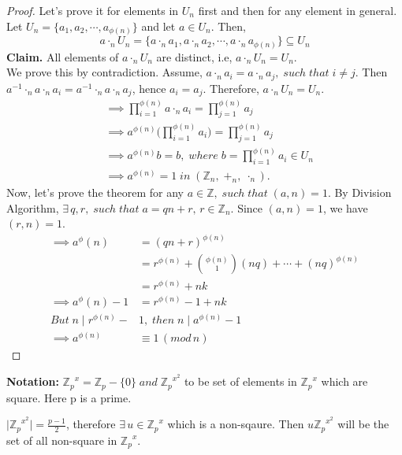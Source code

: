 \documentclass[10pt,a4paper]{article}
\begin{document}
\begin{proof}
Let's prove it for elements in $U_n$ first and then for any element in general. Let $U_n = \{a_1,a_2,\cdots,a_{\phi(n)}\}$ and let $a\in U_n.$ Then,
$$a\cdot_n U_n=\{a\cdot_n a_1,a\cdot_n a_2,\cdots,a\cdot_n a_{\phi(n)}\}\subseteq U_n$$
\textbf{Claim.} All elements of $a\cdot_n U_n$ are distinct, i.e, $a\cdot_n U_n = U_n$. \\
We prove this by contradiction. Assume, $a\cdot_n a_i = a\cdot_n a_j,\;such\;that\;i\neq j$. Then $a^{-1}\cdot_n a\cdot_n a_i = a^{-1}\cdot_n a\cdot_n a_j$, hence $a_i=a_j$. Therefore, $a\cdot_n U_n = U_n$. 
\begin{align*}
&\implies \prod_{i=1}^{\phi(n)}a\cdot_n a_i = \prod_{j=1}^{\phi(n)}a_j \\
&\implies a^{\phi(n)}\Bigg(\prod_{i=1}^{\phi(n)}a_i\Bigg) = \prod_{j=1}^{\phi(n)}a_j \\
&\implies a^{\phi(n)}b = b,\;where\;b=\prod_{i=1}^{\phi(n)}a_i \in U_n \\
&\implies a^{\phi(n)} = 1\;in\;(\mathbb{Z}_{n},\;+_{n},\;\cdot_{n}).
\end{align*}
Now, let's prove the theorem for any $a\in\mathbb{Z},\;such\;that\;(a,n)=1.$
By Division Algorithm, $\exists\,q,r,\;such\;that\;a=qn+r,\,r\in\mathbb{Z}_n.$ Since $(a,n)=1$, we have $(r,n)=1$.
\begin{align*}
\implies a^\phi(n) &= (qn+r)^{\phi(n)} \\
&= r^{\phi(n)} +  \binom{\phi(n)}{1}(nq)+\cdots+(nq)^{\phi(n)} \\
&= r^{\phi(n)} +nk \\
\implies a^\phi(n)-1 &=r^{\phi(n)}-1+nk \\
But\;n\mid r^{\phi(n)}-&1,\;then\;n\mid a^{\phi(n)}-1\\
\implies a^{\phi(n)}&\equiv 1\,(mod\,n)
\end{align*}
\end{proof}
\textbf{Notation:} ${\mathbb{Z}_p}^x=\mathbb{Z}_p-\{0\}\;and\;{\mathbb{Z}_p}^{x^2}$ to be set of elements in ${\mathbb{Z}_p}^x$ which are square. Here p is a prime.

\begin{proposition}
$\vert {\mathbb{Z}_p}^{x^2}\vert=\frac{p-1}{2}$, therefore $\exists\,u\in{\mathbb{Z}_p}^x$ which is a non-sqaure. Then $u{\mathbb{Z}_p}^{x^2}$ will be the set of all non-square in ${\mathbb{Z}_p}^x$.
\end{proposition}
\end{document}
